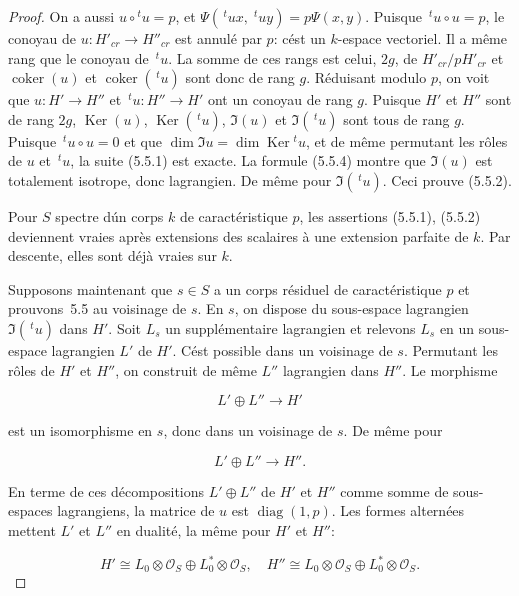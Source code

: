 \documentclass[11pt,a4paper]{article}
\theoremstyle{plain}
\theoremstyle{definition}
\DeclareMathOperator{\Ker}{Ker}
\DeclareMathOperator{\coker}{coker}
\DeclareMathOperator{\diag}{diag}
\begin{document}
\begin{proof}
On a aussi $u \circ \!^t u = p$, et $\Psi(\,\!^t u x, \; \!^t u y) = p \Psi(x, y)$.
Puisque $\,\!^t u \circ u = p$, le conoyau de $u: H'_{cr} \to H''_{cr}$ est annul\'e par $p$: c\'est un
$k$-espace vectoriel. Il a m\^eme rang que le conoyau de $\,\!^t u$. La somme de ces rangs
est celui, $2g$, de $H'_{cr}/pH'_{cr}$ et $\coker(u)$ et $\coker(\,\!^t u)$ sont donc de rang $g$.
R\'eduisant modulo $p$, on voit que $u: H' \to H''$ et $\,\!^t u: H'' \to H'$ ont un conoyau
de rang $g$. Puisque $H'$ et $H''$ sont de rang $2g$, $\Ker(u)$, $\Ker(\,\!^t u)$, $\Im(u)$ et
$\Im(\,\!^t u)$ sont tous de rang $g$. Puisque $\,\!^t u \circ u = 0$
et que $\dim \Im u = \dim \Ker \!^t u$, et de m\^eme
permutant les r\^oles de $u$ et $\,\!^t u$, la suite (5.5.1) est exacte. La formule (5.5.4)
montre que $\Im(u)$ est totalement isotrope, donc lagrangien. De m\^eme pour
$\Im(\,\!^t u)$. Ceci prouve (5.5.2).

Pour $S$ spectre d\'un corps $k$ de caract\'eristique $p$, les assertions (5.5.1), (5.5.2)
deviennent vraies apr\`es extensions des scalaires \`a une extension parfaite de $k$.
Par descente, elles sont d\'ej\`a vraies sur $k$.

Supposons maintenant que $s \in S$ a un corps r\'esiduel de caract\'eristique $p$ et
prouvons~5.5 au voisinage de $s$. En $s$, on dispose du sous-espace lagrangien
$\Im(\,\!^t u)$ dans $H'$. Soit $L_s$ un suppl\'ementaire lagrangien et relevons $L_s$ en un
sous-espace lagrangien $L'$ de $H'$. C\'est possible dans un voisinage de $s$. Permutant
les r\^oles de $H'$ et $H''$, on construit de m\^eme $L''$ lagrangien dans $H''$. Le
morphisme

\begin{equation}
L' \oplus L'' \longrightarrow H'
\end{equation}

est un isomorphisme en $s$, donc dans un voisinage de $s$. De m\^eme pour

\begin{equation}
L' \oplus L'' \longrightarrow H''.
\end{equation}

En terme de ces d\'ecompositions $L' \oplus L''$ de $H'$ et $H''$ comme somme de
sous-espaces lagrangiens, la matrice de $u$ est $\diag(1, p)$. Les formes altern\'ees
mettent $L'$ et $L''$ en dualit\'e, la m\^eme pour $H'$ et $H''$:

\begin{equation}
H' \cong L_0 \otimes \mathscr{O}_S \oplus L_0^* \otimes \mathscr{O}_S, \quad H'' \cong L_0 \otimes \mathscr{O}_S \oplus L_0^* \otimes \mathscr{O}_S.
\end{equation}


\end{proof}
\end{document}
